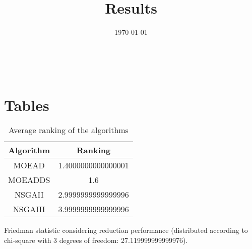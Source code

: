 \documentclass{article}
\title{Results}
\author{}
\date{\today}
\begin{document}
\oddsidemargin 0in \topmargin 0in\maketitle
\
\section{Tables}
\begin{table}[!htp]
\centering
\caption{Average ranking of the algorithms}
\begin{tabular}{c|c}
Algorithm&Ranking\\
\hline
MOEAD&1.4000000000000001\\
MOEADDS&1.6\\
NSGAII&2.9999999999999996\\
NSGAIII&3.9999999999999996\\
\end{tabular}
\end{table}


Friedman statistic considering reduction performance (distributed according to chi-square with 3 degrees of freedom: 27.119999999999976).
\end{document}
